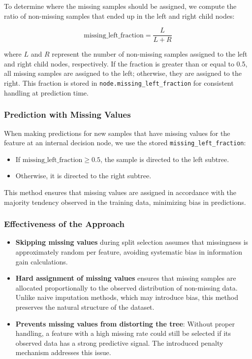 \documentclass[12pt]{article}
\begin{document}
To determine where the missing samples should be assigned, we compute the ratio of non-missing samples that ended up in the left and right child nodes:

\begin{equation}
    \text{missing\_left\_fraction} = \frac{L}{L + R}
\end{equation}

where $L$ and $R$ represent the number of non-missing samples assigned to the left and right child nodes, respectively. If the fraction is greater than or equal to 0.5, all missing samples are assigned to the left; otherwise, they are assigned to the right. This fraction is stored in \texttt{node.missing\_left\_fraction} for consistent handling at prediction time.

\subsubsection{Prediction with Missing Values}
When making predictions for new samples that have missing values for the feature at an internal decision node, we use the stored \texttt{missing\_left\_fraction}:

\begin{itemize}
    \item If $\text{missing\_left\_fraction} \geq 0.5$, the sample is directed to the left subtree.
    \item Otherwise, it is directed to the right subtree.
\end{itemize}

This method ensures that missing values are assigned in accordance with the majority tendency observed in the training data, minimizing bias in predictions.

\subsubsection{Effectiveness of the Approach}
\begin{itemize}
    \item \textbf{Skipping missing values} during split selection assumes that missingness is approximately random per feature, avoiding systematic bias in information gain calculations.
    \item \textbf{Hard assignment of missing values} ensures that missing samples are allocated proportionally to the observed distribution of non-missing data. Unlike naive imputation methods, which may introduce bias, this method preserves the natural structure of the dataset.
    \item \textbf{Prevents missing values from distorting the tree}: Without proper handling, a feature with a high missing rate could still be selected if its observed data has a strong predictive signal. The introduced penalty mechanism addresses this issue.
\end{itemize}
\end{document}
